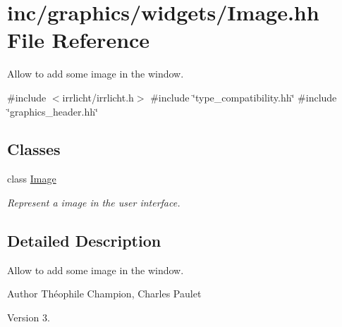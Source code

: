 \hypertarget{Image_8hh}{}\section{inc/graphics/widgets/\+Image.hh File Reference}
\label{Image_8hh}


Allow to add some image in the window.  


{\ttfamily \#include $<$irrlicht/irrlicht.\+h$>$}\newline
{\ttfamily \#include \char`\"{}type\+\_\+compatibility.\+hh\char`\"{}}\newline
{\ttfamily \#include \char`\"{}graphics\+\_\+header.\+hh\char`\"{}}\newline
\subsection*{Classes}
\begin{DoxyCompactItemize}
\item 
class \hyperlink{classImage}{Image}
\begin{DoxyCompactList}\small\item\em Represent a image in the user interface. \end{DoxyCompactList}\end{DoxyCompactItemize}


\subsection{Detailed Description}
Allow to add some image in the window. 

\begin{DoxyAuthor}{Author}
Théophile Champion, Charles Paulet 
\end{DoxyAuthor}
\begin{DoxyVersion}{Version}
3. 
\end{DoxyVersion}
